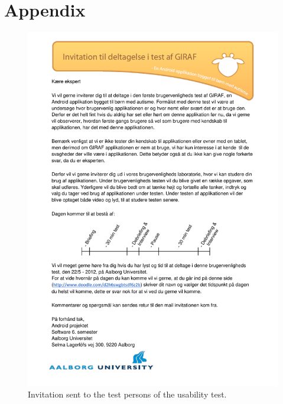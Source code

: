\chapter*{Appendix}

	\begin{figure}%
		\begin{center}
			\includegraphics[width=\textwidth]{Appendix/invitation_to_usability_test.pdf}
		\end{center}
		\caption{Invitation sent to the test persons of the usability test.}
		\label{appendice:usability_test}
	\end{figure}

	



